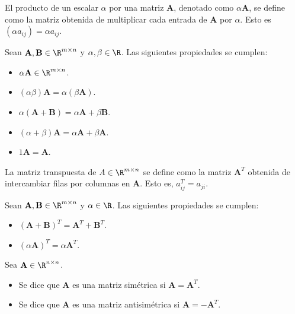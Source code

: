 \begin{defi}
El producto de un escalar $\alpha$ por una matriz $\mathbf{A}$, denotado como $\alpha \mathbf{A}$, se define como la matriz obtenida de multiplicar cada entrada de $\mathbf{A}$ por $\alpha$. Esto es $(\alpha a_{ij}) = \alpha a_{ij}$.
\end{defi}

\begin{prop}
Sean $\mathbf{A}, \mathbf{B} \in \R^{m \times n}$ y $\alpha, \beta \in \R$. Las siguientes propiedades se cumplen:

\begin{itemize}
\item $\alpha \mathbf{A} \in \R^{m \times n}$.
\item $(\alpha \beta) \mathbf{A} = \alpha (\beta \mathbf{A})$.
\item $\alpha(\mathbf{A} + \mathbf{B}) = \alpha \mathbf{A} + \beta \mathbf{B}$.
\item $(\alpha + \beta)\mathbf{A} = \alpha \mathbf{A} + \beta \mathbf{A}$.
\item $1 \mathbf{A} = \mathbf{A}$.
\end{itemize}
\end{prop}

\begin{defi}
La matriz transpuesta de $A \in \R^{m \times n}$ se define como la matriz $\mathbf{A}^T$ obtenida de intercambiar filas por columnas en $\mathbf{A}$. Esto es, $a_{ij}^T = a_{ji}$.
\end{defi}

\begin{prop}
Sean $\mathbf{A}, \mathbf{B} \in \R^{m \times n}$ y $\alpha \in \R$. Las siguientes propiedades se cumplen:

\begin{itemize}
\item $(\mathbf{A} + \mathbf{B})^T = \mathbf{A}^T + \mathbf{B}^T$.
\item $(\alpha \mathbf{A})^T = \alpha \mathbf{A}^T$.
\end{itemize}
\end{prop}

\begin{defi}
Sea $\mathbf{A} \in \R^{n\times n}$.

\begin{itemize}
\item Se dice que $\mathbf{A}$ es una matriz simétrica si $\mathbf{A} = \mathbf{A}^T$.
\item Se dice que $\mathbf{A}$ es una matriz antisimétrica si $\mathbf{A} = -\mathbf{A}^T$.
\end{itemize}
\end{defi}


